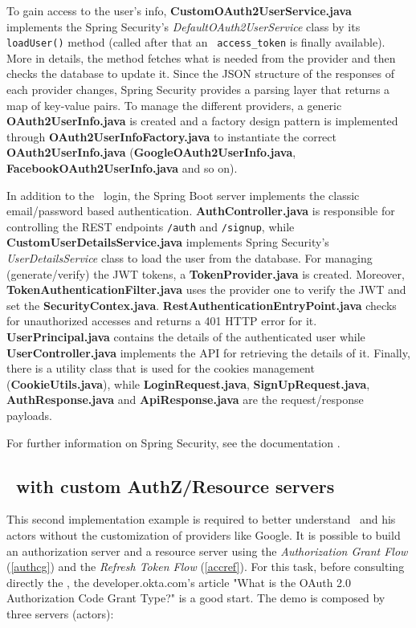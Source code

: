 To gain access to the user's info, \textbf{CustomOAuth2UserService.java} implements the Spring Security's \textit{DefaultOAuth2UserService} class by its \texttt{loadUser()} method (called after that an \oauth\ \texttt{access\_token} is finally available). More in details, the method fetches what is needed from the provider and then checks the database to update it. Since the JSON structure of the responses of each provider changes, Spring Security provides a parsing layer that returns a map of key-value pairs. To manage the different providers, a generic \textbf{OAuth2UserInfo.java} is created and a factory design pattern is implemented through \textbf{OAuth2UserInfoFactory.java} to instantiate the correct \textbf{OAuth2UserInfo.java} (\textbf{GoogleOAuth2UserInfo.java}, \textbf{FacebookOAuth2UserInfo.java} and so on).

In addition to the \oauth\ login, the Spring Boot server implements the classic email/password based authentication. \textbf{AuthController.java} is responsible for controlling the REST endpoints \texttt{/auth} and \texttt{/signup}, while \textbf{CustomUserDetailsService.java} implements Spring Security's \textit{UserDetailsService} class to load the user from the database. For managing (generate/verify) the JWT tokens, a \textbf{TokenProvider.java} is created. Moreover, \textbf{TokenAuthenticationFilter.java} uses the provider one to verify the JWT and set the \textbf{SecurityContex.java}. \textbf{RestAuthenticationEntryPoint.java} checks for unauthorized accesses and returns a 401 HTTP error for it. \textbf{UserPrincipal.java} contains the details of the authenticated user while \textbf{UserController.java} implements the API for retrieving the details of it. Finally, there is a utility class that is used for the cookies management (\textbf{CookieUtils.java}), while \textbf{LoginRequest.java}, \textbf{SignUpRequest.java}, \textbf{AuthResponse.java} and \textbf{ApiResponse.java} are the request/response payloads.

For further information on Spring Security, see the documentation \cite{sprsec}.

\subsection{\oauth\ with custom AuthZ/Resource servers}
This second implementation example is required to better understand \oauth\ and his actors without the customization of providers like Google. It is possible to build an authorization server and a resource server using the \textit{Authorization Grant Flow} (\ref{authcg}) and the \textit{Refresh Token Flow} (\ref{accref}). For this task, before consulting directly the , the developer.okta.com's article "What is the OAuth 2.0 Authorization Code Grant Type?" \cite{oauth2} is a good start. The demo is composed by three servers (actors):

